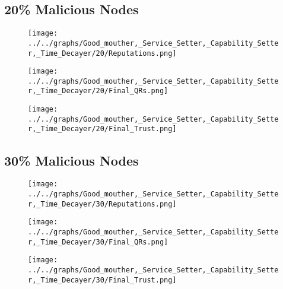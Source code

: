 \begin{minipage}[t]{0.49\columnwidth}
\subsection*{20\% Malicious Nodes}
    \begin{figure}[H]
        \centering
        \texttt{[image: ../../graphs/Good\_mouther,\_Service\_Setter,\_Capability\_Setter,\_Time\_Decayer/20/Reputations.png]}
    \end{figure}
    \begin{figure}[H]
        \centering
        \texttt{[image: ../../graphs/Good\_mouther,\_Service\_Setter,\_Capability\_Setter,\_Time\_Decayer/20/Final\_QRs.png]}
    \end{figure}
\end{minipage}
\begin{minipage}[t]{0.49\columnwidth}
    \begin{figure}[H]
        \centering
        \texttt{[image: ../../graphs/Good\_mouther,\_Service\_Setter,\_Capability\_Setter,\_Time\_Decayer/20/Final\_Trust.png]}
    \end{figure}
\end{minipage}

\begin{minipage}[t]{0.49\columnwidth}
\subsection*{30\% Malicious Nodes}
    \begin{figure}[H]
        \centering
        \texttt{[image: ../../graphs/Good\_mouther,\_Service\_Setter,\_Capability\_Setter,\_Time\_Decayer/30/Reputations.png]}
    \end{figure}
    \begin{figure}[H]
        \centering
        \texttt{[image: ../../graphs/Good\_mouther,\_Service\_Setter,\_Capability\_Setter,\_Time\_Decayer/30/Final\_QRs.png]}
    \end{figure}
\end{minipage}
\begin{minipage}[t]{0.49\columnwidth}
    \begin{figure}[H]
        \centering
        \texttt{[image: ../../graphs/Good\_mouther,\_Service\_Setter,\_Capability\_Setter,\_Time\_Decayer/30/Final\_Trust.png]}
    \end{figure}
\end{minipage}

